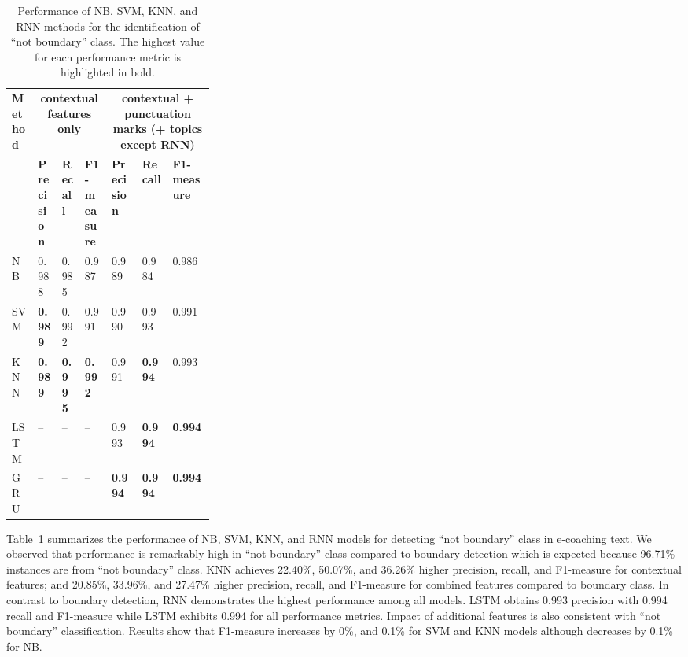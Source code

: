 \documentclass{amia}
\begin{document}
\begin{table}[ht]
\centering
\caption{Performance of NB, SVM, KNN, and RNN methods for the identification of ``not boundary'' class. The highest value for each performance metric is highlighted in bold.}
\label{tab:result_not_boundary}
  \begin{tabular}{|l|l|l|l|p{0.15\linewidth}|p{0.15\linewidth}|l|}
  \hline
   \multirow{2}{*}{\textbf{Method}} & \multicolumn{3}{|c|}{\textbf{contextual features only}} & \multicolumn{3}{|c|}{\textbf{contextual + punctuation marks (+ topics except RNN)}} \\\cline{2-7}
   & \textbf{Precision}  & \textbf{Recall} & \textbf{F1-measure} & \textbf{Precision}  & \textbf{Recall} & \textbf{F1-measure}\\ \hline    
    
 NB & 0.988 & 0.985 & 0.987 & 0.989 & 0.984 & 0.986 \\ \hline
 SVM & \textbf{0.989} & 0.992 & 0.991 & 0.990 & 0.993 & 0.991\\ \hline
 KNN & \textbf{0.989} & \textbf{0.995} & \textbf{0.992} & 0.991 & \textbf{0.994} & 0.993\\ \hline
 LSTM & -- & -- & -- & 0.993 & \textbf{0.994} & \textbf{0.994} \\ \hline
 GRU & -- & -- & -- & \textbf{0.994} & \textbf{0.994} & \textbf{0.994} \\ \hline 
  \end{tabular}
\end{table}

Table~\ref{tab:result_not_boundary} summarizes the performance of NB, SVM, KNN, and RNN models for detecting ``not boundary'' class in e-coaching text. We observed that performance is remarkably high in ``not boundary'' class compared to boundary detection which is expected because 96.71\% instances are from ``not boundary'' class. KNN achieves 22.40\%, 50.07\%, and 36.26\% higher precision, recall, and F1-measure for contextual features; and 20.85\%, 33.96\%, and 27.47\% higher precision, recall, and F1-measure for combined features compared to boundary class. In contrast to boundary detection, RNN demonstrates the highest performance among all models. LSTM obtains 0.993 precision with 0.994 recall and F1-measure while LSTM exhibits 0.994 for all performance metrics. Impact of additional features is also consistent with ``not boundary'' classification. Results show that F1-measure increases by 0\%, and 0.1\% for SVM and KNN models although decreases by 0.1\% for NB. \\
\end{document}
